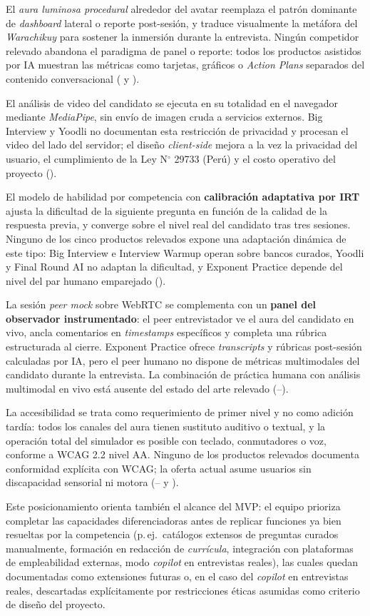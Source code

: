 El \textit{aura luminosa procedural} alrededor del avatar reemplaza el
patrón dominante de \textit{dashboard} lateral o reporte post-sesión,
y traduce visualmente la metáfora del \textit{Warachikuy} para
sostener la inmersión durante la entrevista. Ningún competidor relevado
abandona el paradigma de panel o reporte: todos los productos asistidos
por IA muestran las métricas como tarjetas, gráficos o
\textit{Action Plans} separados del contenido conversacional (
y ).

El análisis de video del candidato se ejecuta en su totalidad en el
navegador mediante \textit{MediaPipe}, sin envío de imagen cruda a
servicios externos. Big Interview y Yoodli no documentan esta
restricción de privacidad y procesan el video del lado del servidor; el
diseño \textit{client-side} mejora a la vez la privacidad del usuario,
el cumplimiento de la Ley N${}^\circ$ 29733 (Perú) y el costo operativo
del proyecto ().

El modelo de habilidad por competencia con \textbf{calibración
adaptativa por IRT} ajusta la dificultad de la siguiente pregunta en
función de la calidad de la respuesta previa, y converge sobre el
nivel real del candidato tras tres sesiones. Ninguno de los cinco
productos relevados expone una adaptación dinámica de este tipo:
Big Interview e Interview Warmup operan sobre bancos curados, Yoodli y
Final Round AI no adaptan la dificultad, y Exponent Practice depende
del nivel del par humano emparejado ().

La sesión \textit{peer mock} sobre WebRTC se complementa con un
\textbf{panel del observador instrumentado}: el peer entrevistador ve
el aura del candidato en vivo, ancla comentarios en \textit{timestamps}
específicos y completa una rúbrica estructurada al cierre. Exponent
Practice ofrece \textit{transcripts} y rúbricas post-sesión calculadas
por IA, pero el peer humano no dispone de métricas multimodales del
candidato durante la entrevista. La combinación de práctica humana con
análisis multimodal en vivo está ausente del estado del arte relevado
(--).

La accesibilidad se trata como requerimiento de primer nivel y no
como adición tardía: todos los canales del aura tienen sustituto
auditivo o textual, y la operación total del simulador es posible
con teclado, conmutadores o voz, conforme a WCAG 2.2 nivel AA.
Ninguno de los productos relevados documenta conformidad explícita
con WCAG; la oferta actual asume usuarios sin discapacidad sensorial
ni motora (-- y ).

Este posicionamiento orienta también el alcance del MVP: el equipo
prioriza completar las capacidades diferenciadoras antes de replicar
funciones ya bien resueltas por la competencia (p.\,ej.\ catálogos
extensos de preguntas curados manualmente, formación en redacción de
\textit{currícula}, integración con plataformas de empleabilidad
externas, modo \textit{copilot} en entrevistas reales), las cuales
quedan documentadas como extensiones futuras o, en el caso del
\textit{copilot} en entrevistas reales, descartadas explícitamente por
restricciones éticas asumidas como criterio de diseño del proyecto.
